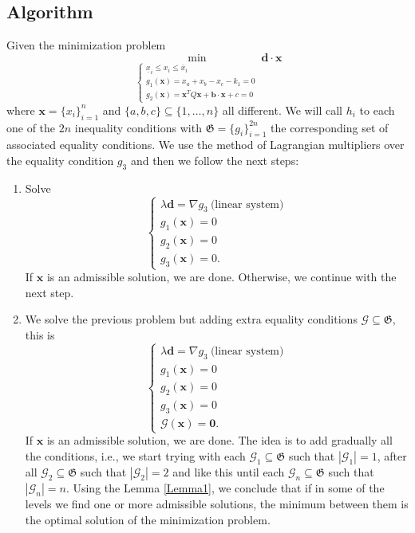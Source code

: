 \documentclass[12pt]{article}
\theoremstyle{definition}
\theoremstyle{remark}
\begin{document}
\subsection{Algorithm}\label{Alg-Sec}

Given the minimization problem
\begin{equation*}
\min_{\begin{cases}
\underline{x}_i\leq x_i\leq\overline{x}_i\\
g_1(\bm{x})=x_a+x_b-x_c-k_1=0\\
g_2(\bm{x})=\bm{x}^TQ\bm{x}+\bm{b}\cdot\bm{x}+c=0
\end{cases}} \bm{d}\cdot\bm{x}
\end{equation*}
where $\bm{x}=\{x_i\}_{i=1}^n$ and $\{a,b,c\}\subseteq\{1,\dots,n\}$ all different. We will call $h_i$ to each one of the $2n$ inequality conditions with $\mathfrak{G}=\{g_i\}_{i=1}^{2n}$ the corresponding set of associated equality conditions. We use the method of Lagrangian multipliers over the equality condition $g_3$ and then we follow the next steps:
\begin{enumerate}
\item Solve
\begin{equation*}
\begin{cases}
\lambda \bm{d}=\nabla g_3\ \text{(linear system)}\\
g_1(\bm{x})=0\\
g_2(\bm{x})=0\\
g_3(\bm{x})=0.
\end{cases}
\end{equation*}
If $\bm{x}$ is an admissible solution, we are done. Otherwise, we continue with the next step.

\item We solve the previous problem but adding extra equality conditions $\mathcal{G}\subseteq\mathfrak{G}$, this is
\begin{equation*}
\begin{cases}
\lambda\bm{d}=\nabla g_3\ \text{(linear system)}\\
g_1(\bm{x})=0\\
g_2(\bm{x})=0\\
g_3(\bm{x})=0\\
\mathcal{G}(\bm{x})=\bm{0}.
\end{cases}
\end{equation*}
If $\bm{x}$ is an admissible solution, we are done. The idea is to add gradually all the conditions, i.e., we start trying with each $\mathcal{G}_1\subseteq\mathfrak{G}$ such that $|\mathcal{G}_1|=1$, after all $\mathcal{G}_2\subseteq\mathfrak{G}$ such that $|\mathcal{G}_2|=2$ and like this until each $\mathcal{G}_n\subseteq\mathfrak{G}$ such that $|\mathcal{G}_n|=n$. Using the Lemma \ref{Lemma1}, we conclude that if in some of the levels we find one or more admissible solutions, the minimum between them is the optimal solution of the minimization problem.
\end{enumerate}
\end{document}
